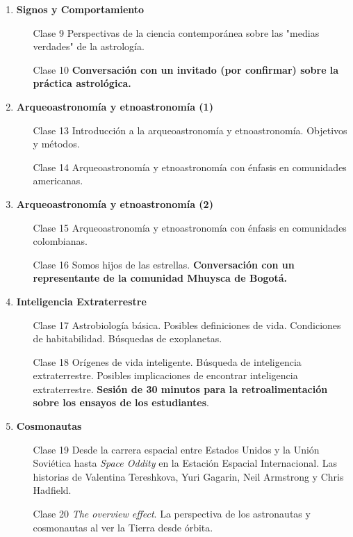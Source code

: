 \documentclass[12pt]{report}
\begin{document}
\begin{enumerate}
\item {\bf Signos y Comportamiento}
\begin{itemize}
\item[Clase 9] Perspectivas de la ciencia contempor\'anea sobre las
  "medias verdades" de la astrolog\'ia.
\item[Clase 10] {\bf Conversaci\'on con un invitado (por confirmar) sobre
  la pr\'actica astrol\'ogica.} 
\end{itemize}

\item {\bf Arqueoastronom\'ia y etnoastronom\'ia (1)}
\begin{itemize}
\item[Clase 13] Introducci\'on a la arqueoastronom\'ia y
  etnoastronom\'ia. Objetivos y m\'etodos. 
\item[Clase 14] Arqueoastronom\'ia y etnoastronom\'ia con \'enfasis en
  comunidades americanas.
\end{itemize}

\item {\bf Arqueoastronom\'ia y etnoastronom\'ia (2)}
\begin{itemize}
\item[Clase 15] Arqueoastronom\'ia y etnoastronom\'ia con \'enfasis en
  comunidades colombianas.
\item[Clase 16] Somos hijos de las estrellas. {\bf Conversaci\'on con un
  representante de la comunidad Mhuysca de Bogot\'a.} 
\end{itemize}

\item {\bf Inteligencia Extraterrestre}
\begin{itemize}
\item[Clase 17] Astrobiolog\'ia b\'asica. Posibles definiciones de
  vida. Condiciones de habitabilidad. B\'usquedas de exoplanetas.
\item[Clase 18] Or\'igenes de vida inteligente.  B\'usqueda de
  inteligencia extraterrestre. Posibles implicaciones de encontrar
  inteligencia extraterrestre.
  {\bf Sesi\'on de 30 minutos para la retroalimentaci\'on sobre los
    ensayos de los estudiantes}. 
\end{itemize}

\item {\bf Cosmonautas}
\begin{itemize}
\item[Clase 19] Desde la carrera espacial entre Estados Unidos y la Uni\'on
  Sovi\'etica hasta \emph{Space Oddity} en la Estaci\'on Espacial
  Internacional. Las historias de Valentina Tereshkova, Yuri Gagarin,
  Neil Armstrong y Chris Hadfield.
\item[Clase 20] \emph{The overview effect}. La perspectiva de los
  astronautas y cosmonautas al ver la Tierra desde \'orbita.
\end{itemize}


\end{enumerate}
\end{document}

